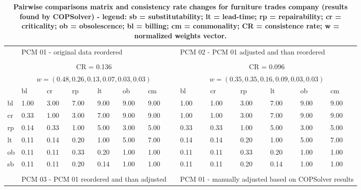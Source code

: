 \documentclass[10pt,fleqn,a4paper,twoside]{article}
\begin{document}
\begin{table}[ht]
            \begin{center}
                \caption{\textbf{Pairwise comparisons matrix and consistency rate changes for furniture trades company (results found by COPSolver) - legend: sb = substitutability; lt = lead-time; rp = repairability; cr = criticality; ob = obsolescence; bl = billing; cm = commonality; CR = consistence rate; w = normalized weights vector.}}
                    \begin{small}
                    \begin{tabular}[l]{p{0.4cm} p{0.5cm} p{0.5cm} p{0.5cm} p{0.5cm} p{0.5cm} p{0.5cm} p{0.1cm} | p{0.5cm} p{0.5cm} p{0.5cm} p{0.5cm} p{0.5cm} p{0.5cm}}
                        \\
   						& \multicolumn{6}{l}{PCM 01 - original data reordered} & & \multicolumn{6}{l}{PCM 02 - PCM 01 adjusted and than reordered} \\
						\cline {1-14} \\
  						& \multicolumn{6}{c}{CR = 0.136}  & & \multicolumn{6}{c}{CR = 0.096} \\
  						& \multicolumn{6}{c}{$w=(0.48, 0.26, 0.13, 0.07, 0.03, 0.03)$} & & \multicolumn{6}{c}{$w = (0.35, 0.35, 0.16, 0.09, 0.03, 0.03)$} \\
   						& bl & cr & rp & lt & ob & cm & & bl & cr & rp & lt & ob & cm \\        
						bl & 1.00 & 3.00 & 7.00 & 9.00 & 9.00 & 9.00 & & 1.00 & \cellcolor[HTML]{ACE600} 1.00 & \cellcolor[HTML]{ACE600} 3.00 & \cellcolor[HTML]{ACE600} 7.00 & 9.00 & 9.00 \\
						cr & 0.33 & 1.00 & 3.00 & 7.00 & 9.00 & 9.00 & & \cellcolor[HTML]{ACE600} 1.00 & 1.00 & 3.00 & 7.00 & 9.00 & 9.00 \\
						rp & 0.14 & 0.33 & 1.00 & 5.00 & 3.00 & 5.00 & & \cellcolor[HTML]{ACE600} 0.33 & 0.33 & 1.00 & 5.00 & 3.00 & 5.00 \\
						lt & 0.11 & 0.14 & 0.20 & 1.00 & 5.00 & 7.00 & & \cellcolor[HTML]{ACE600} 0.14 & 0.14 & 0.20 & 1.00 & 5.00 & 7.00 \\
						ob & 0.11 & 0.11 & 0.33 & 0.20 & 1.00 & 1.00 & & 0.11 & 0.11 & 0.33 & 0.20 & 1.00 & 1.00 \\
						sb & 0.11 & 0.11 & 0.20 & 0.14 & 1.00 & 1.00 & & 0.11 & 0.11 & 0.20 & 0.14 & 1.00 & 1.00 \\
						\cline {1-14} \\
						& \multicolumn{6}{l}{PCM 03 - PCM 01 reordered and than adjusted} & & \multicolumn{6}{l}{PCM 01 - manually adjusted based on COPSolver results} \\

\end{tabular}
\end{small}
\end{center}
\end{table}
\end{document}
